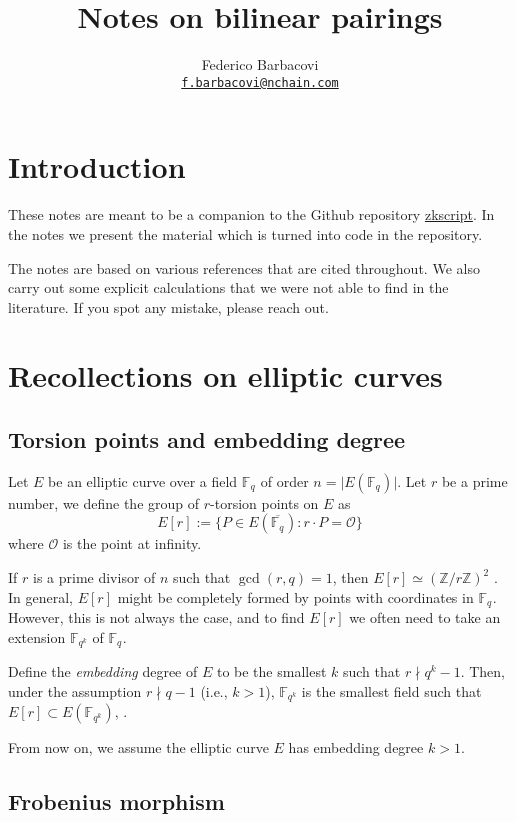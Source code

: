 \documentclass{article}
\title{Notes on bilinear pairings}
\author{Federico Barbacovi \\ \href{mailto:f.barbacovi@nchain.com}{\texttt{f.barbacovi@nchain.com}}}
\newcommand{\fq}[1]{\mathbb{F}_{q^{#1}}}
\newcommand{\cO}{\mathcal{O}}
\theoremstyle{remark}
\theoremstyle{plain}
\begin{document}
\maketitle
\tableofcontents

\section{Introduction}

These notes are meant to be a companion to the Github repository \href{https://github.com/nchain-innovation/zkscript_package}{zkscript}.
In the notes we present the material which is turned into code in the repository.

The notes are based on various references that are cited throughout.
We also carry out some explicit calculations that we were not able to find in the literature.
If you spot any mistake, please reach out.

\section{Recollections on elliptic curves}

\subsection{Torsion points and embedding degree}

Let $E$ be an elliptic curve over a field $\fq{}$ of order $n = \vert E(\fq{}) \vert$.
Let $r$ be a prime number, we define the group of $r$-torsion points on $E$ as
\[
E[r] := \{ P \in E(\overline{\fq{}}): r \cdot P = \cO \}
\]
where $\cO$ is the point at infinity.

If $r$ is a prime divisor of $n$ such that $\gcd(r,q) = 1$, then $E[r] \simeq (\mathbb{Z}/r\mathbb{Z})^2$ \cite{ADC-handbook-ECC}.
In general, $E[r]$ might be completely formed by points with coordinates in $\fq{}$.
However, this is not always the case, and to find $E[r]$ we often need to take an extension $\fq{k}$ of $\fq{}$.

Define the \emph{embedding} degree of $E$ to be the smallest $k$ such that $r \nmid q^k - 1$.
Then, under the assumption $r \nmid q - 1$ (i.e., $k > 1$), $\fq{k}$ is the smallest field such that $E[r] \subset E(\fq{k})$, \cite[Thm. 1]{BK-improbability-ec-subexp-dlog}.

From now on, we assume the elliptic curve $E$ has embedding degree $k > 1$.

\subsection{Frobenius morphism}
\end{document}
